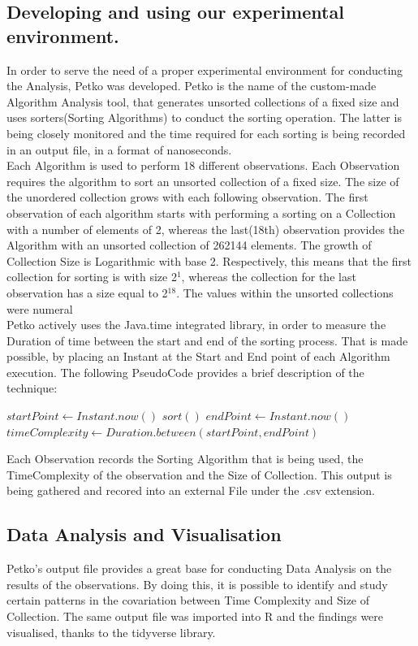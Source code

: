 \documentclass[]{report}
\begin{document}
	\subsection{Developing and using our experimental environment.}
	In order to serve the need of a proper experimental environment  for conducting the Analysis, Petko was developed. Petko is the name of the custom-made  Algorithm Analysis tool, that generates unsorted collections of a fixed size and uses sorters(Sorting Algorithms) to conduct the sorting operation. The latter is being closely monitored and the time required for each sorting is being recorded in an output file, in a format of nanoseconds. \\
	Each Algorithm is used to perform 18 different observations. Each Observation requires the algorithm to sort an unsorted collection of a fixed size. The size of the unordered collection grows with each following observation. The first observation of each algorithm starts with performing a sorting on a Collection with a number of elements of 2, whereas the last(18th) observation provides the Algorithm with an unsorted collection of 262144 elements. The growth of Collection Size is Logarithmic with base 2. Respectively, this means that the first collection for sorting is with size 2$^{1}$, whereas the collection for the last observation has a size equal to 2$^{18}$. The values within the unsorted collections were numeral\\
	Petko actively uses the Java.time integrated library, in order to measure the Duration of time between the start and end of the sorting process. That is made possible, by placing an Instant at the Start and End point of each Algorithm execution. The following PseudoCode provides a brief description of the technique:
	\begin{algorithmic}[H]
		\State $startPoint \gets Instant.now()$
		\State $sort()$
		\State $endPoint \gets Instant.now()$
		\State $timeComplexity \gets Duration.between(startPoint, endPoint)$
		\end{algorithmic} 
	\newpage
		 Each Observation records the Sorting Algorithm that is being used, the TimeComplexity of the observation and the Size of Collection. This output is being gathered and recored into an external File under the .csv extension. 
		\subsection{Data Analysis and Visualisation}
		Petko's output file provides a great base for conducting Data Analysis on the results of the observations. By doing this, it is possible to identify and study certain patterns in the covariation between Time Complexity and Size of Collection. The same output file was imported into R and the findings were visualised, thanks to the tidyverse library.
\end{document}
